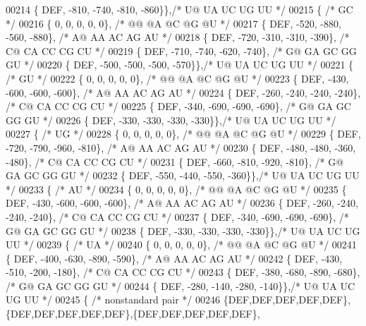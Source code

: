 \begin{DoxyCode}
00214    \{ DEF, -810, -740, -810, -860\}\},\textcolor{comment}{/* U@  UA  UC  UG  UU */}
00215   \{ \textcolor{comment}{/* GC */}
00216    \{   0,    0,    0,    0,    0\}, \textcolor{comment}{/* @@  @A  @C  @G  @U */}
00217    \{ DEF, -520, -880, -560, -880\}, \textcolor{comment}{/* A@  AA  AC  AG  AU */}
00218    \{ DEF, -720, -310, -310, -390\}, \textcolor{comment}{/* C@  CA  CC  CG  CU */}
00219    \{ DEF, -710, -740, -620, -740\}, \textcolor{comment}{/* G@  GA  GC  GG  GU */}
00220    \{ DEF, -500, -500, -500, -570\}\},\textcolor{comment}{/* U@  UA  UC  UG  UU */}
00221   \{ \textcolor{comment}{/* GU */}
00222    \{   0,    0,    0,    0,    0\}, \textcolor{comment}{/* @@  @A  @C  @G  @U */}
00223    \{ DEF, -430, -600, -600, -600\}, \textcolor{comment}{/* A@  AA  AC  AG  AU */}
00224    \{ DEF, -260, -240, -240, -240\}, \textcolor{comment}{/* C@  CA  CC  CG  CU */}
00225    \{ DEF, -340, -690, -690, -690\}, \textcolor{comment}{/* G@  GA  GC  GG  GU */}
00226    \{ DEF, -330, -330, -330, -330\}\},\textcolor{comment}{/* U@  UA  UC  UG  UU */}
00227   \{ \textcolor{comment}{/* UG */}
00228    \{   0,    0,    0,    0,    0\}, \textcolor{comment}{/* @@  @A  @C  @G  @U */}
00229    \{ DEF, -720, -790, -960, -810\}, \textcolor{comment}{/* A@  AA  AC  AG  AU */}
00230    \{ DEF, -480, -480, -360, -480\}, \textcolor{comment}{/* C@  CA  CC  CG  CU */}
00231    \{ DEF, -660, -810, -920, -810\}, \textcolor{comment}{/* G@  GA  GC  GG  GU */}
00232    \{ DEF, -550, -440, -550, -360\}\},\textcolor{comment}{/* U@  UA  UC  UG  UU */}
00233   \{ \textcolor{comment}{/* AU */}
00234    \{   0,    0,    0,    0,    0\}, \textcolor{comment}{/* @@  @A  @C  @G  @U */}
00235    \{ DEF, -430, -600, -600, -600\}, \textcolor{comment}{/* A@  AA  AC  AG  AU */}
00236    \{ DEF, -260, -240, -240, -240\}, \textcolor{comment}{/* C@  CA  CC  CG  CU */}
00237    \{ DEF, -340, -690, -690, -690\}, \textcolor{comment}{/* G@  GA  GC  GG  GU */}
00238    \{ DEF, -330, -330, -330, -330\}\},\textcolor{comment}{/* U@  UA  UC  UG  UU */}
00239   \{ \textcolor{comment}{/* UA */}
00240    \{   0,    0,    0,    0,    0\}, \textcolor{comment}{/* @@  @A  @C  @G  @U */}
00241    \{ DEF, -400, -630, -890, -590\}, \textcolor{comment}{/* A@  AA  AC  AG  AU */}
00242    \{ DEF, -430, -510, -200, -180\}, \textcolor{comment}{/* C@  CA  CC  CG  CU */}
00243    \{ DEF, -380, -680, -890, -680\}, \textcolor{comment}{/* G@  GA  GC  GG  GU */}
00244    \{ DEF, -280, -140, -280, -140\}\},\textcolor{comment}{/* U@  UA  UC  UG  UU */}
00245   \{ \textcolor{comment}{/* nonstandard pair */}
00246    \{DEF,DEF,DEF,DEF,DEF\},\{DEF,DEF,DEF,DEF,DEF\},\{DEF,DEF,DEF,DEF,DEF\},

\end{DoxyCode}
